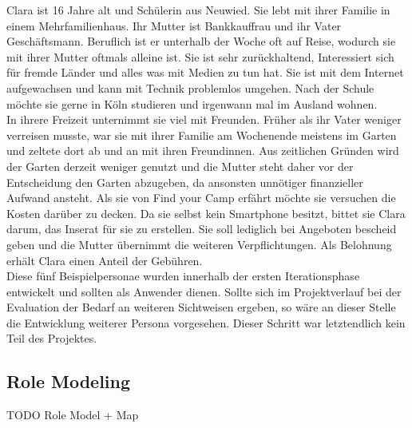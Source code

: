 Clara ist 16 Jahre alt und Schülerin aus Neuwied. 
Sie lebt mit ihrer Familie in einem Mehrfamilienhaus. Ihr Mutter ist Bankkauffrau und ihr Vater Geschäftsmann. Beruflich ist er unterhalb der Woche oft auf Reise, wodurch sie mit ihrer Mutter oftmals alleine ist.
Sie ist sehr zurückhaltend, Interessiert sich für fremde Länder und alles was mit Medien zu tun hat. Sie ist mit dem Internet aufgewachsen und kann mit Technik problemlos umgehen.
Nach der Schule möchte sie gerne in Köln studieren und irgenwann mal im Ausland wohnen.\\
In ihrere Freizeit unternimmt sie viel mit Freunden. Früher als ihr Vater weniger verreisen musste, war sie mit ihrer Familie am Wochenende meistens im Garten und zeltete dort ab und an mit ihren Freundinnen.
Aus zeitlichen Gründen wird der Garten derzeit weniger genutzt und die Mutter steht daher vor der Entscheidung den Garten abzugeben, da ansonsten unnötiger finanzieller Aufwand ansteht.
Als sie von Find your Camp erfährt möchte sie versuchen die Kosten darüber zu decken. Da sie selbst kein Smartphone besitzt, bittet sie Clara darum, das Inserat für sie zu erstellen. Sie soll lediglich bei Angeboten bescheid geben und die Mutter übernimmt die weiteren Verpflichtungen. Als Belohnung erhält Clara einen Anteil der Gebühren.\\


Diese fünf Beispielpersonae wurden innerhalb der ersten Iterationsphase entwickelt und sollten als Anwender dienen. 
Sollte sich im Projektverlauf bei der Evaluation der Bedarf an weiteren Sichtweisen ergeben, so wäre an dieser Stelle die Entwicklung weiterer Persona vorgesehen. Dieser Schritt war letztendlich kein Teil des Projektes.

\newpage
\subsection{Role Modeling}
TODO Role Model + Map


